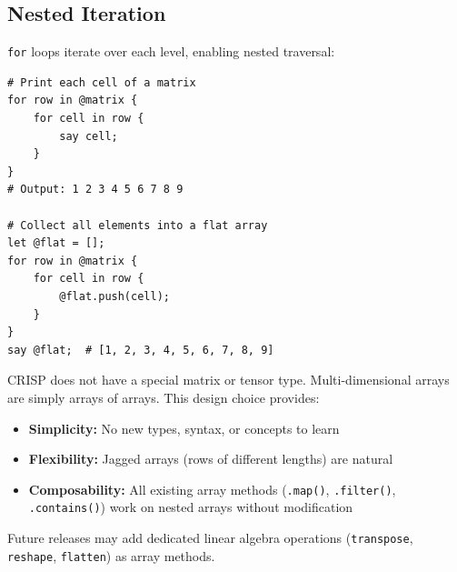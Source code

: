 \clearpage
\subsection{Nested Iteration}

\texttt{for} loops iterate over each level, enabling nested traversal:

\begin{tcolorbox}[colback=codebg, colframe=darkpurple, colbacktitle=darkpurple, title=\textbf{\textcolor{codegold}{Nested For Loops}}, fonttitle=\bfseries, sharp corners]
\begin{lstlisting}
# Print each cell of a matrix
for row in @matrix {
    for cell in row {
        say cell;
    }
}
# Output: 1 2 3 4 5 6 7 8 9

# Collect all elements into a flat array
let @flat = [];
for row in @matrix {
    for cell in row {
        @flat.push(cell);
    }
}
say @flat;  # [1, 2, 3, 4, 5, 6, 7, 8, 9]
\end{lstlisting}
\end{tcolorbox}

\begin{tcolorbox}[colback=lightlavender, colframe=softvioletdark, title=\textbf{\textcolor{darkpurple}{Design Note: No Special Matrix Type}}, fonttitle=\bfseries, sharp corners]
CRISP does not have a special matrix or tensor type. Multi-dimensional arrays are simply arrays of arrays. This design choice provides:

\begin{itemize}
    \item \textbf{Simplicity:} No new types, syntax, or concepts to learn
    \item \textbf{Flexibility:} Jagged arrays (rows of different lengths) are natural
    \item \textbf{Composability:} All existing array methods (\texttt{.map()}, \texttt{.filter()}, \texttt{.contains()}) work on nested arrays without modification
\end{itemize}

Future releases may add dedicated linear algebra operations (\texttt{transpose}, \texttt{reshape}, \texttt{flatten}) as array methods.
\end{tcolorbox}
